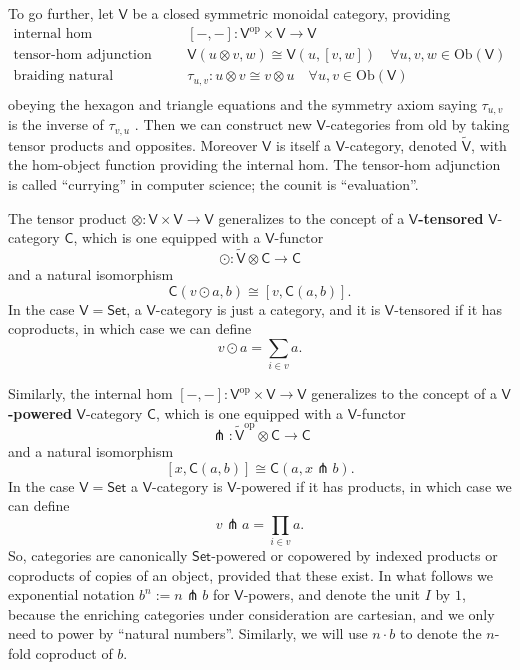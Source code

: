 \documentclass{amsart}
\theoremstyle{definition}
\newcommand{\Set}{\mathsf{Set}}
\newcommand{\V}{\mathsf{V}}
\newcommand{\C}{\mathsf{C}}
\newcommand{\op}{\mathrm{op}}
\newcommand{\Obj}{\mathrm{Ob}}
\newcommand{\pfk}{\pitchfork}
\newcommand{\maps}{\colon}
\begin{document}
To go further, let $\V$ be a closed symmetric monoidal category, providing
\[\begin{array}{rl}
\text{internal hom} & [-,-]\maps\V^\op \times \V \to \V\\
\text{tensor-hom adjunction} & \V(u\otimes v,w) \cong \V(u,[v,w]) \quad \forall u,v,w \in \Obj(\V)\\
\text{braiding natural isomorphism} & \tau_{u,v}\maps u \otimes v \cong v \otimes u \quad \forall u,v \in \Obj(\V)\\
\end{array}\]
obeying the hexagon and triangle equations and the symmetry axiom saying $\tau_{u,v}$ is the inverse of $\tau_{v,u}$ \cite{maclane}.   Then we can construct new $\V$-categories from old by taking tensor products and opposites.   Moreover $\V$ is itself a $\V$-category, denoted $\tilde{\V}$, with the hom-object function providing the internal hom. The tensor-hom adjunction is called ``currying'' in computer science; the counit is ``evaluation''.  

The tensor product $\otimes \maps \V \times \V \to \V$ generalizes to the 
concept of a \textbf{$\V$-tensored} $\V$-category $\C$, which is one equipped with a 
$\V$-functor
\[
	\odot \maps \tilde{\V} \otimes \C \to \C
\]
and a natural isomorphism
\begin{equation}\label{eq:co-power}
	\C(v\odot a,b) \cong \left[v, \C(a,b)\right].
\end{equation}
In the case $\V = \Set$, a $\V$-category is just a category, and it is $\V$-tensored if
it has coproducts, in which case we can define
\[       v \odot a = \sum_{i \in v} a . \]
 
Similarly, the internal hom $[-,-] \maps \V^\op \times \V \to \V $ generalizes to the 
concept of a \textbf{$\V$-powered} $\V$-category $\C$, which is one equipped
with a $\V$-functor 
\[
\pfk \maps \tilde{\V}^\op \otimes \C \to \C 
\]
and a natural isomorphism
\begin{equation}\label{eq:power}
	 \left[x, \C(a,b)\right] \cong \C(a,x\pfk b) .
\end{equation}
In the case $\V = \Set$ a $\V$-category is $\V$-powered if it has products,
in which case we can define
\[          v \pfk a = \prod_{i \in v} a .\]
So, categories are canonically $\Set$-powered or copowered by indexed products or coproducts of copies of an object, provided that these exist.  In what follows we exponential notation $b^n := n\pfk b$ for $\V$-powers, and denote the unit $I$ by $1$, because the enriching categories under consideration are cartesian, and we only need to power by ``natural numbers''.  Similarly, we will use $n \cdot b$ to denote the $n$-fold coproduct of $b$.
\end{document}
